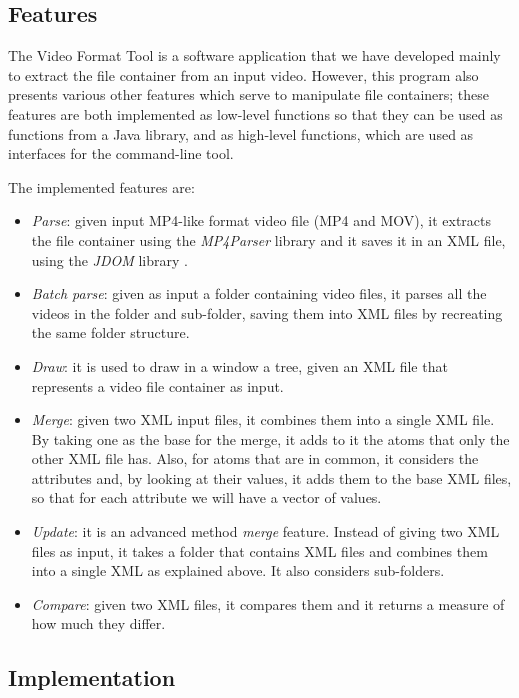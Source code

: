 \subsection{Features}

The Video Format Tool is a software application that we have developed mainly to extract the file container from an input video. However, this program also presents various other features which serve to manipulate file containers; these features are both implemented as low-level functions so that they can be used as functions from a Java library, and as high-level functions, which are used as interfaces for the command-line tool.

The implemented features are:
\begin{itemize}
\item \emph{Parse}: given input MP4-like format video file (MP4 and MOV), it extracts the file container using the \emph{MP4Parser} library \cite{mp4parser} and it saves it in an XML file, using the \emph{JDOM} library \cite{jdom}.
\item \emph{Batch parse}: given as input a folder containing video files, it parses all the videos in the folder and sub-folder, saving them into XML files by recreating the same folder structure.
\item \emph{Draw}: it is used to draw in a window a tree, given an XML file that represents a video file container as input.
\item \emph{Merge}: given two XML input files, it combines them into a single XML file. By taking one as the base for the merge, it adds to it the atoms that only the other XML file has. Also, for atoms that are in common, it considers the attributes and, by looking at their values, it adds them to the base XML files, so that for each attribute we will have a vector of values.
\item \emph{Update}: it is an advanced method \emph{merge} feature. Instead of giving two XML files as input, it takes a folder that contains XML files and combines them into a single XML as explained above. It also considers sub-folders.
\item \emph{Compare}: given two XML files, it compares them and it returns a measure of how much they differ.
\end{itemize}

\subsection{Implementation} 
 
